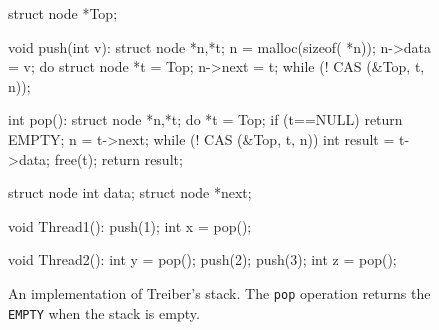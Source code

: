 \begin{figure}[t]
  \scriptsize
  \begin{minipage}[t]{41mm}
    \begin{program}
struct node *Top;      
      
void push(int v):
  struct node *n,*t;
  n = malloc(sizeof( *n));
  n->data = v;
  do {
    struct node *t = Top;
    n->next = t;
  } while (! CAS (&Top, t, n));
    \end{program}
  \end{minipage}
  \begin{minipage}[t]{40mm}
    \begin{program}
int pop():
  struct node *n,*t;
  do {
    *t = Top;
    if (t==NULL) return EMPTY;
    n = t->next;
  } while (! CAS (&Top, t, n))
  int result = t->data;
  free(t);
  return result;
    \end{program}
  \end{minipage}
  \begin{minipage}[t]{30mm}
    \begin{program}
struct node {
  int data;
  struct node *next;
}
    \end{program}
  \end{minipage}
  \begin{minipage}[t]{25mm}
    \begin{program}
void Thread1():
  push(1);
  int x = pop();
    \end{program}
  \end{minipage}
  \begin{minipage}[t]{25mm}
    \begin{program}
void Thread2():
  int y = pop();
  push(2);
  push(3);
  int z = pop();
    \end{program}
  \end{minipage}

  \caption{An implementation of Treiber's stack. The {\tt pop} operation
  returns the {\tt EMPTY} when the stack is empty.}
  \label{fig:treiber}
\end{figure}


